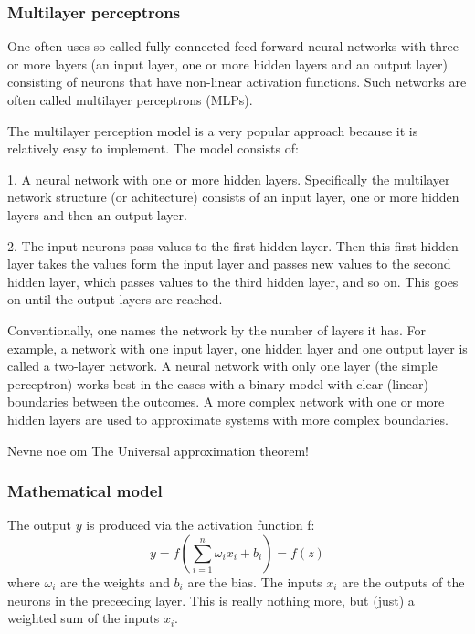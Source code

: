 \documentclass[a4paper,12pt]{article}
\begin{document}
\subsubsection{Multilayer perceptrons}
One often uses so-called fully connected feed-forward neural networks with three or more layers (an input layer, one or more hidden layers and an output layer) consisting of neurons that have non-linear activation functions. Such networks are often called multilayer perceptrons (MLPs).\newline

The multilayer perception model is a very popular approach because it is relatively easy to implement. The model consists of:\newline

1. A neural network with one or more hidden layers. Specifically the multilayer network structure (or achitecture) consists of an input layer, one or more hidden layers and then an output layer.\newline

2. The input neurons pass values to the first hidden layer. Then this first hidden layer takes the values form the input layer and passes new values to the second hidden layer, which passes values to the third hidden layer, and so on. This goes on until the output layers are reached. \newline

Conventionally, one names the network by the number of layers it has. For example, a network with one input layer, one hidden layer and one output layer is called a two-layer network. A neural network with only one layer (the simple perceptron) works best in the cases with a binary model with clear (linear) boundaries between the outcomes. A more complex network with one or more hidden layers are used to approximate systems with more complex boundaries.

Nevne noe om The Universal approximation theorem!


\subsubsection{Mathematical model}
The output $y$ is produced via the activation function f:
\begin{equation}
    y = f( \sum_{i=1}^n{\omega_i x_i + b_i} ) = f(z)
\end{equation}
where $\omega_i$ are the weights and $b_i$ are the bias. The inputs $x_i$ are the outputs of the neurons in the preceeding layer.\newline
This is really nothing more, but (just) a weighted sum of the inputs $x_i$.\newline
\end{document}

